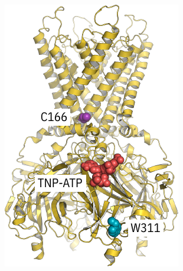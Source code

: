\begin{figure}[h]
	\centering
	\begin{subfigure}[t]{0.3\textwidth}
		\caption{}\label{ch5fig:c166s_loc}
		\centering
		\includegraphics[width=\textwidth]{c166s_1.pdf}
	\end{subfigure}
	\hfill
	\begin{subfigure}[t]{0.5\textwidth}
		\caption{}\label{ch5fig:c166s_popfits}
		\centering

\end{subfigure}
\end{figure}
